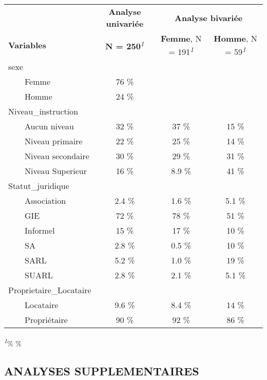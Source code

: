 \documentclass[
  14pt,
]{article}
\begin{document}
\setlength{\LTpost}{0mm}
\begin{longtable}{lccc}
\toprule
 & \textbf{Analyse univariée} & \multicolumn{2}{c}{\textbf{Analyse bivariée}} \\ 
\cmidrule(lr){2-2} \cmidrule(lr){3-4}
\textbf{Variables} & \textbf{N = 250}\textsuperscript{\textit{1}} & \textbf{Femme}, N = 191\textsuperscript{\textit{1}} & \textbf{Homme}, N = 59\textsuperscript{\textit{1}} \\ 
\midrule
sexe &  &  &  \\ 
    Femme & 76 \%  &  &  \\ 
    Homme & 24 \%  &  &  \\ 
Niveau\_instruction &  &  &  \\ 
    Aucun niveau & 32 \%  & 37 \%  & 15 \%  \\ 
    Niveau primaire & 22 \%  & 25 \%  & 14 \%  \\ 
    Niveau secondaire & 30 \%  & 29 \%  & 31 \%  \\ 
    Niveau Superieur & 16 \%  & 8.9 \%  & 41 \%  \\ 
Statut\_juridique &  &  &  \\ 
    Association & 2.4 \%  & 1.6 \%  & 5.1 \%  \\ 
    GIE & 72 \%  & 78 \%  & 51 \%  \\ 
    Informel & 15 \%  & 17 \%  & 10 \%  \\ 
    SA & 2.8 \%  & 0.5 \%  & 10 \%  \\ 
    SARL & 5.2 \%  & 1.0 \%  & 19 \%  \\ 
    SUARL & 2.8 \%  & 2.1 \%  & 5.1 \%  \\ 
Proprietaire\_Locataire &  &  &  \\ 
    Locataire & 9.6 \%  & 8.4 \%  & 14 \%  \\ 
    Propriétaire & 90 \%  & 92 \%  & 86 \%  \\ 
\bottomrule
\end{longtable}
\begin{minipage}{\linewidth}
\textsuperscript{\textit{1}}\% \%\\
\end{minipage}

\newpage

\hypertarget{analyses-supplementaires}{%
\subsection{\texorpdfstring{\textbf{ANALYSES SUPPLEMENTAIRES}\\
}{ANALYSES SUPPLEMENTAIRES }}\label{analyses-supplementaires}}
\end{document}

